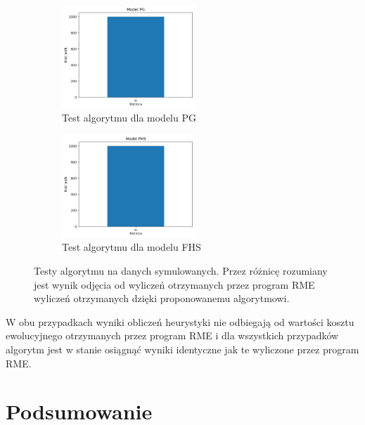 \documentclass[licencjacka]{pracamgr}
\begin{document}
\begin{figure}[H]
\centering
\begin{subfigure}{.5\textwidth}
  \centering
  \includegraphics[width=50mm]{./pictures/PG.png}
  \caption{Test algorytmu dla modelu PG}
\end{subfigure}%
\begin{subfigure}{.5\textwidth}
  \centering
  \includegraphics[width=50mm]{./pictures/FHS.png}
  \caption{Test algorytmu dla modelu FHS}
\end{subfigure}%
\caption{Testy algorytmu na danych symulowanych. Przez różnicę rozumiany jest wynik odjęcia od wyliczeń otrzymanych przez program RME wyliczeń otrzymanych dzięki proponowanemu algorytmowi. }
\end{figure}

W obu przypadkach wyniki obliczeń heurystyki nie odbiegają od wartości kosztu ewolucyjnego otrzymanych przez program RME i dla wszystkich przypadków algorytm jest w stanie osiągnąć wyniki identyczne jak te wyliczone przez program RME. 

\chapter{Podsumowanie}
\end{document}
